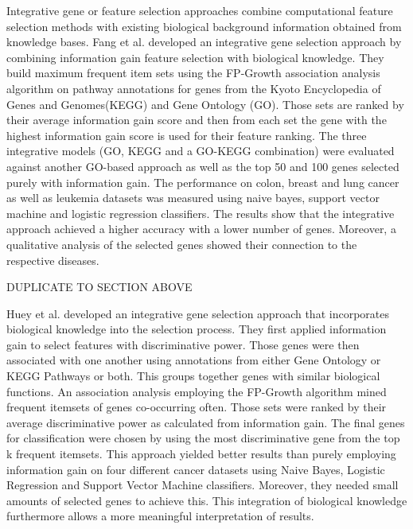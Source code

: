 Integrative gene or feature selection approaches combine computational feature selection methods with existing biological background information obtained from knowledge bases. Fang et al. developed an integrative gene selection approach by combining information gain feature selection with biological knowledge. They build maximum frequent item sets using the FP-Growth association analysis algorithm on pathway annotations for genes from the Kyoto Encyclopedia of Genes and Genomes(KEGG) and Gene Ontology (GO). Those sets are ranked by their average information gain score and then from each set the gene with the highest information gain score is used for their feature ranking. The three integrative models (GO, KEGG and a GO-KEGG combination) were evaluated against another GO-based approach as well as the top 50 and 100 genes selected purely with information gain. The performance on colon, breast and lung cancer as well as leukemia datasets was measured using naive bayes, support vector machine and logistic regression classifiers. The results show that the integrative approach achieved a higher accuracy with a lower number of genes. Moreover, a qualitative analysis of the selected genes showed their connection to the respective diseases.\cite{fang2014integrative}

DUPLICATE TO SECTION ABOVE

Huey et al. developed an integrative gene selection approach that incorporates biological knowledge into the selection process. They first applied information gain to select features with discriminative power. Those genes were then associated with one another using annotations from either Gene Ontology or KEGG Pathways or both. This groups together genes with similar biological functions. An association analysis employing the FP-Growth algorithm mined frequent itemsets of genes co-occurring  often. Those sets were ranked by their average discriminative power as calculated from information gain. The final genes for classification were chosen by using the most discriminative gene from the top k frequent itemsets. This approach yielded better results than purely employing information gain on four different cancer datasets using Naive Bayes, Logistic Regression and Support Vector Machine classifiers. Moreover, they needed small amounts of selected genes to achieve this. This integration of biological knowledge furthermore allows a more meaningful interpretation of results. 
\cite{fang2014integrative}

